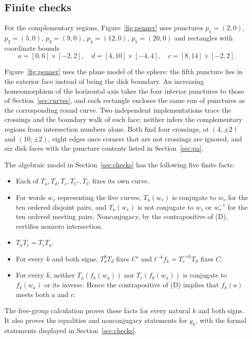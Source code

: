 \documentclass[11pt]{article}
\theoremstyle{remark}
\begin{document}
\begin{appendices}
\section{Finite checks}\label{app:diagram}\label{app:algebra}

For the complementary regions, Figure~\ref{fig:penner} uses
punctures $p_1=(2,0)$, $p_2=(5,0)$, $p_3=(9,0)$, $p_4=(12,0)$,
$p_5=(20,0)$ and rectangles with coordinate
bounds
\[
 a=[0,6]\times[-2,2],\quad d=[4,10]\times[-4,4],\quad
 c=[8,14]\times[-2,2].
\]

Figure~\ref{fig:penner} uses the plane model of the sphere: the fifth
puncture lies in the exterior face instead of being the disk boundary. An
increasing homeomorphism of the horizontal axis takes the four interior
punctures to those of Section~\ref{sec:curves}, and each rectangle encloses
the same run of punctures as the corresponding round curve. Two
independent implementations trace the crossings and the boundary walk of
each face; neither infers the complementary regions from intersection
numbers alone. Both find four crossings, at $(4,\pm2)$ and $(10,\pm2)$,
eight edges once corners that are not crossings are ignored, and six disk
faces with the puncture contents listed in Section~\ref{sec:pa}.

The algebraic model in Section~\ref{sec:checks} has the following five finite facts:

\begin{itemize}
\item[F0.] Each of $T_a,T_d,T_c,T_{C'},T_C$ fixes its own curve.
\item[F1.] For words $w_v$ representing the five curves, $T_u(w_v)$ is conjugate to $w_v$
  for the ten ordered disjoint pairs, and $T_u(w_v)$ is not conjugate
  to $w_v$ or $w_v^{-1}$ for the ten ordered meeting pairs.
  Nonconjugacy, by the contrapositive of (D), certifies nonzero intersection.
\item[F2.] $T_aT_c=T_cT_a$.
\item[F3.] For every $k$ and both signs, $T_a^kT_d$ fixes $C'$ and
  $t^{-k}f_k=T_c^{-\varepsilon k}T_d$ fixes $C$.
\item[F4.] For every $k$, neither $T_a(f_k(w_a))$ nor $T_c(f_k(w_a))$
  is conjugate to $f_k(w_a)$ or its inverse. Hence the contrapositive of (D) implies
  that $f_k(a)$ meets both $a$ and $c$.
\end{itemize}

The free-group calculation proves these facts for every natural $k$ and
both signs. It also proves the equalities and nonconjugacy statements for
$g_k$, with the formal statements displayed in Section~\ref{sec:checks}.


\end{appendices}
\end{document}
